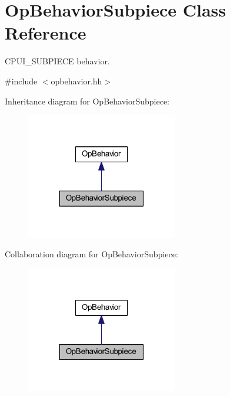 \hypertarget{class_op_behavior_subpiece}{}\section{Op\+Behavior\+Subpiece Class Reference}
\label{class_op_behavior_subpiece}


C\+P\+U\+I\+\_\+\+S\+U\+B\+P\+I\+E\+CE behavior.  




{\ttfamily \#include $<$opbehavior.\+hh$>$}



Inheritance diagram for Op\+Behavior\+Subpiece\+:
\nopagebreak
\begin{figure}[H]
\begin{center}
\leavevmode
\includegraphics[width=187pt]{class_op_behavior_subpiece__inherit__graph}
\end{center}
\end{figure}


Collaboration diagram for Op\+Behavior\+Subpiece\+:
\nopagebreak
\begin{figure}[H]
\begin{center}
\leavevmode
\includegraphics[width=187pt]{class_op_behavior_subpiece__coll__graph}
\end{center}
\end{figure}
